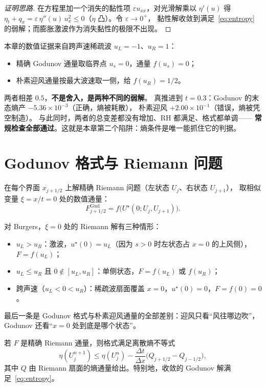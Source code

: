 \begin{proof}[证明思路]
在方程里加一个消失的黏性项 $\varepsilon u_{xx}$，对光滑解乘以 $\eta'(u)$ 得
$\eta_t+q_x=\varepsilon\,\eta''(u)\,u_x^2\le0$（$\eta$ 凸）。令 $\varepsilon\to0^+$，
黏性解收敛到满足~\eqref{eq:entropy} 的弱解；而膨胀激波作为消失黏性的极限不出现。
\end{proof}

本章的数值证据来自跨声速稀疏波 $u_L=-1$、$u_R=1$：
\begin{itemize}
  \item 精确 Godunov 通量取临界点 $u_s=0$，通量 $f(u_s)=0$；
  \item 朴素迎风通量按最大波速取一侧，给 $f(u_R)=1/2$。
\end{itemize}
两者相差 $0.5$，\textbf{不是舍入，是两种不同的弱解}。
真推进到 $t=0.3$：Godunov 的末态熵产 $-5.36\times10^{-3}$（正确，熵被耗散），
朴素迎风 $+2.00\times10^{-1}$（错误，熵被凭空制造）。
与此同时，两者的总变差都没有增加、RH 都满足、格式都单调——
\textbf{常规检查全部通过}。这就是本章第二个陷阱：熵条件是唯一能抓住它的判据。

\section{Godunov 格式与 Riemann 问题}

\begin{definition}[Godunov 通量]
在每个界面 $x_{j+1/2}$ 上解精确 Riemann 问题（左状态 $U_j$、右状态 $U_{j+1}$），
取相似变量 $\xi=x/t=0$ 处的数值通量：
\begin{equation}
  F^{\text{Gud}}_{j+1/2}=f\bigl(U^\star(0;U_j,U_{j+1})\bigr).
\end{equation}
\end{definition}

对 Burgers，$\xi=0$ 处的 Riemann 解有三种情形：
\begin{itemize}
  \item $u_L>u_R$：激波，$u^\star(0)=u_L$（因为 $s>0$ 时左状态占 $x=0$ 的上风侧），$F=f(u_L)$；
  \item $u_L\le u_R$ 且 $0\notin[u_L,u_R]$：单侧状态，$F=f(u_L)$ 或 $f(u_R)$；
  \item 跨声速（$u_L<0<u_R$）：稀疏波扇面覆盖 $x=0$，$u^\star(0)=0$，$F=f(0)=0$。
\end{itemize}
最后一条是 Godunov 格式与朴素迎风通量的全部差别：迎风只看``风往哪边吹''，
Godunov 还看``$x=0$ 处到底是哪个状态''。

\begin{theorem}
\label{thm:godunov-entropy}
若 $F$ 是精确 Riemann 通量，则格式满足离散熵不等式
\begin{equation}
  \eta(U_j^{n+1})\le\eta(U_j^n)
  -\frac{\Delta t}{\Delta x}\bigl(Q_{j+1/2}-Q_{j-1/2}\bigr),
\end{equation}
其中 $Q$ 由 Riemann 扇面的熵通量给出。特别地，收敛的 Godunov 解满足~\eqref{eq:entropy}。
\end{theorem}

